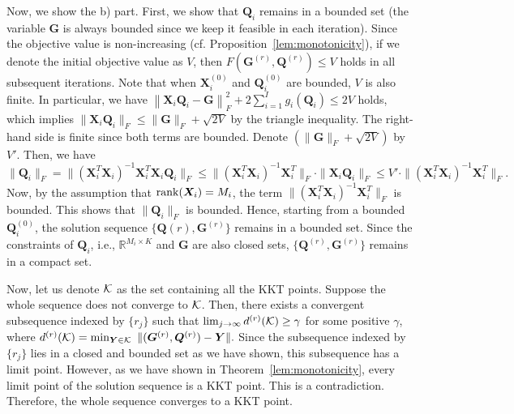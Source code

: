 \documentclass[10pt,journal]{IEEEtran}
\newcommand{\Q}{\boldsymbol{Q}}
\begin{document}
\bigskip

Now, we show the b) part.
First, we show that ${\bm Q}_i$ remains in a bounded set (the variable ${\bm G}$ is always bounded since we keep it feasible in each iteration). 
Since the objective value is non-increasing (cf. Proposition~\ref{lem:monotonicity}), if we denote the initial objective value as $V$, then $F({\bm G}^{(r)},{\bm Q}^{(r)}) \leq V$ holds in all subsequent iterations.  
Note that when ${\bm X}_i^{(0)}$ and ${\bm Q}_i^{(0)}$ are bounded, $V$ is also finite. 
In particular, we have $\left\| {\bm X}_i {\bm Q}_i - {\bm G} \right\|_F^2 + 2\sum_{i=1}^Ig_i(\Q_i) \leq 2V$
holds, which implies
$ \| {\bm X}_i {\bm Q}_i \|_F \leq \| {\bm G} \|_F + \sqrt{2V}$
by the triangle inequality.
The right-hand side is finite since both terms are bounded. Denote $ ( \| {\bm G} \|_F + \sqrt{2V} )$ by $V'$. Then, we have
$\| {\bm Q}_i \|_F = \| ({\bm X}_i^T{\bm X}_i)^{-1} {\bm X}_i^T{\bm X}_i {\bm Q}_i \|_F
\leq \| ({\bm X}_i^T{\bm X}_i)^{-1} {\bm X}_i^T \|_F \cdot \|{\bm X}_i {\bm Q}_i \|_F
\leq V' \cdot \| ({\bm X}_i^T{\bm X}_i)^{-1} {\bm X}_i^T \|_F.$
Now, by the assumption that ${\rm rank}({\bm X}_i)=M_i$, the term $\| ({\bm X}_i^T{\bm X}_i)^{-1} {\bm X}_i^T \|_F$ is bounded.  This shows that $\| {\bm Q}_i \|_F$ is bounded.
Hence, starting from a bounded ${\bm Q}_i^{(0)}$, the solution sequence $\{{\bm Q}{(r)},{\bm G}^{(r)}\}$ remains in a bounded set. Since the constraints of ${\bm Q}_i$, i.e., $\mathbb{R}^{M_i\times K}$ and ${\bm G}$ are also closed sets,  $\{{\bm Q}^{(r)},{\bm G}^{(r)}\}$ remains in a compact set.

Now, let us denote ${\cal K}$ as the set containing all the KKT points.
Suppose the whole sequence does not converge to ${\cal K}$.
Then, there exists a convergent subsequence indexed by $\{r_j\}$ such that
$\lim_{j\rightarrow \infty} d^{(r)}({\cal K})\geq \gamma$
for some positive $\gamma$, where
$d^{(r)}({\cal K}) = \min_{{\bm Y}\in{\cal K}}~\|({\bm G}^{(r)},{\bm Q}^{(r)}) - {\bm Y}\|.$
Since the subsequence indexed by $\{r_j\}$ lies in a closed and bounded set as we have shown,
this subsequence has a limit point.
However, as we have shown in Theorem~\ref{lem:monotonicity}, every limit point of the solution sequence is a KKT point.
This is a contradiction.
Therefore, the whole sequence converges to a KKT point.
\end{document}
